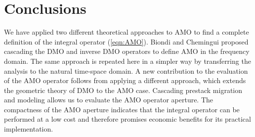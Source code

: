\section{Conclusions}

We have applied two different theoretical approaches to AMO to find a
complete definition of the integral
operator (\ref{eqn:AMO}). Biondi and Chemingui 
proposed cascading the DMO and inverse DMO operators to define AMO in
the frequency domain. The
same approach is repeated here in a simpler way by transferring the
analysis to the natural time-space domain. A new contribution to the
evaluation of the AMO operator follows from applying a different
approach, which extends the geometric theory of DMO
\cite{GPR29.03.03740406} to the AMO case. Cascading prestack
migration and modeling allows us to evaluate the AMO operator aperture.
The compactness of the AMO aperture indicates that the integral operator can be
performed at a low cost and therefore
promises economic benefits for its practical implementation.


{}\appendix{}
